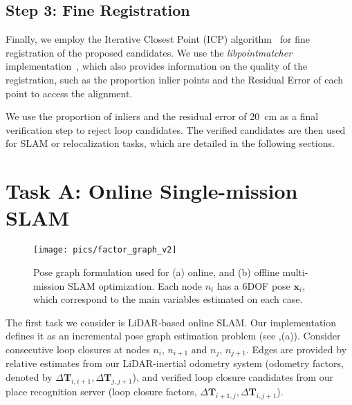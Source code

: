 \subsection*{\textbf{Step 3: Fine Registration}}
\label{subsubsec:fine-registration}
Finally, we employ the Iterative Closest Point (ICP) algorithm~\cite{besl1992icp} for fine registration of the proposed candidates. We use the \emph{libpointmatcher} implementation~\cite{pomerleau2013iros}, which also provides information on the quality of the registration, such as the proportion inlier points and the Residual Error of each point to access the alignment.

We use the proportion of inliers and the residual error of \SI{20}{\centi\meter} as a final verification step to reject loop candidates. The verified candidates are then used for SLAM or relocalization tasks, which are detailed in the following sections.

\section{Task A: Online Single-mission SLAM} 
\label{sec:online_slam_mode}
\begin{figure}[t]
  \centering
  \texttt{[image: pics/factor\_graph\_v2]}
  \caption{Pose graph formulation used for (a) online, and (b) offline multi-mission SLAM optimization. Each node $n_{i}$ has a 6DOF pose $\mathbf{x}_{i}$, which correspond to the main variables estimated on each case.}
  \label{fig:factor_graph}
\end{figure}

The first task we consider is LiDAR-based online SLAM. Our implementation defines it as an incremental pose graph estimation problem (see ,(a)). Consider consecutive loop closures at nodes $n_{i}$, $n_{i+1}$ and $n_{j}$, $n_{j+1}$. Edges are provided by relative estimates from our LiDAR-inertial odometry system (odometry factors, denoted by $\Delta\mathbf{T}_{i,i+1}, \Delta\mathbf{T}_{j, j+1}$), and verified loop closure candidates from our place recognition server (loop closure factors, $\Delta\mathbf{T}_{i+1, j}, \Delta\mathbf{T}_{i, j+1}$).


